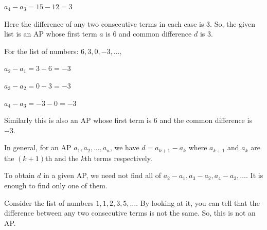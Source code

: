 \documentclass[12pt,a4paper]{book}
\begin{document}
$a_4 - a_3 = 15 - 12 = 3$

Here the difference of any two consecutive terms in each case is 3. So, the
given list is an AP whose first term $a$ is 6 and common difference $d$ is 3.

For the list of numbers: $6, 3, 0, -3, \ldots,$

$a_2 - a_1 = 3 - 6 = -3$

$a_3 - a_2 = 0 - 3 = -3$

$a_4 - a_3 = -3 - 0 = -3$

Similarly this is also an AP whose first term is 6 and the common difference
is $-3$.

In general, for an AP $a_1, a_2, \ldots, a_n$, we have
$d = a_{k+1} - a_k$
where $a_{k+1}$ and $a_k$ are the $(k+1)$th and the $k$th terms respectively.

To obtain $d$ in a given AP, we need not find all of $a_2 - a_1, a_3 - a_2, a_4 - a_3, \ldots$.
It is enough to find only one of them.

Consider the list of numbers $1, 1, 2, 3, 5, \ldots$. By looking at it, you can tell that the
difference between any two consecutive terms is not the same. So, this is not an AP.
\end{document}
